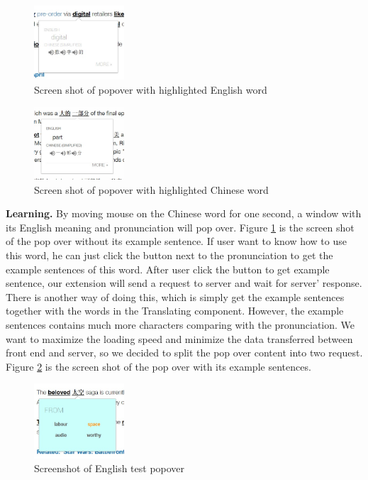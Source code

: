\begin{figure}[ht]
  \centering
    \includegraphics[width=0.3\textwidth]{software_design_4.jpg}
  \caption{Screen shot of popover with highlighted English word}
  \label{fig:software_design_4}
\end{figure}

\begin{figure}[ht]
    \centering
    \includegraphics[width=0.3\textwidth]{software_design_5.jpg}
    \caption{Screen shot of popover with highlighted Chinese word}
    \label{fig:software_design_5}
\end{figure}

{\bf Learning.} By moving mouse on the Chinese word for one second, a window with its English meaning and pronunciation will pop over. Figure \ref{fig:software_design_4} is the screen shot of the pop over without its example sentence. If user want to know how to use this word, he can just click the button next to the pronunciation to get the example sentences of this word. After user click the button to get example sentence, our extension will send a request to server and wait for server' response. There is another way of doing this, which is simply get the example sentences together with the words in the Translating component. However, the example sentences contains much more characters comparing with the pronunciation. We want to maximize the loading speed and minimize the data transferred between front end and server, so we decided to split the pop over content into two request. Figure \ref{fig:software_design_5} is the screen shot of the pop over with its example sentences.

\begin{figure}[ht]
\centering
  \centering
  \includegraphics[width=0.3\textwidth]{software_design_7.jpg}
  \caption{Screenshot of English test popover}
  \label{fig:software_design_7}
\end{figure}

